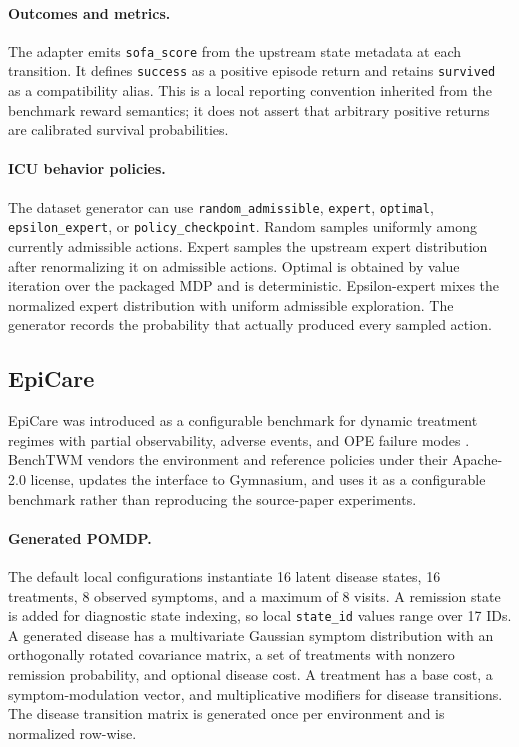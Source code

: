\documentclass[10pt,twocolumn]{article}
\newcommand{\code}[1]{\texttt{#1}}
\begin{document}
\paragraph{Outcomes and metrics.}
The adapter emits \code{sofa\_score} from the upstream state metadata at each transition. It defines \code{success} as a positive episode return and retains \code{survived} as a compatibility alias. This is a local reporting convention inherited from the benchmark reward semantics; it does not assert that arbitrary positive returns are calibrated survival probabilities.

\paragraph{ICU behavior policies.}
The dataset generator can use \code{random\_admissible}, \code{expert}, \code{optimal}, \code{epsilon\_expert}, or \code{policy\_checkpoint}. Random samples uniformly among currently admissible actions. Expert samples the upstream expert distribution after renormalizing it on admissible actions. Optimal is obtained by value iteration over the packaged MDP and is deterministic. Epsilon-expert mixes the normalized expert distribution with uniform admissible exploration. The generator records the probability that actually produced every sampled action.

\subsection{EpiCare}
\label{sec:epicare}

EpiCare was introduced as a configurable benchmark for dynamic treatment regimes with partial observability, adverse events, and OPE failure modes \cite{hargrave2024epicare}. BenchTWM vendors the environment and reference policies under their Apache-2.0 license, updates the interface to Gymnasium, and uses it as a configurable benchmark rather than reproducing the source-paper experiments.

\paragraph{Generated POMDP.}
The default local configurations instantiate 16 latent disease states, 16 treatments, 8 observed symptoms, and a maximum of 8 visits. A remission state is added for diagnostic state indexing, so local \code{state\_id} values range over 17 IDs. A generated disease has a multivariate Gaussian symptom distribution with an orthogonally rotated covariance matrix, a set of treatments with nonzero remission probability, and optional disease cost. A treatment has a base cost, a symptom-modulation vector, and multiplicative modifiers for disease transitions. The disease transition matrix is generated once per environment and is normalized row-wise.
\end{document}
